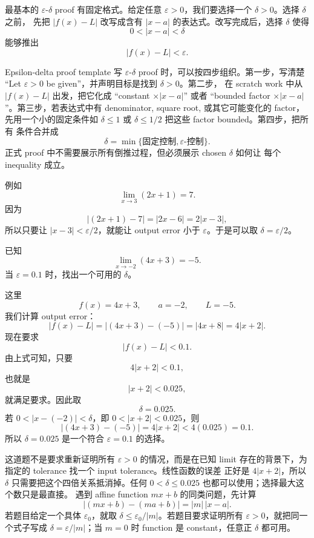 最基本的 \(\varepsilon\)-\(\delta\) proof 有固定格式。给定任意
\(\varepsilon>0\)，我们要选择一个 \(\delta>0\)。选择 \(\delta\) 之前，
先把 \(|f(x)-L|\) 改写成含有 \(|x-a|\) 的表达式。改写完成后，选择
\(\delta\) 使得
\[
  0<|x-a|<\delta
\]
能够推出
\[
  |f(x)-L|<\varepsilon.
\]

\begin{reviewbox}{Epsilon-delta proof template}
写 \(\varepsilon\)-\(\delta\) proof 时，可以按四步组织。第一步，写清楚
``Let \(\varepsilon>0\) be given''，并声明目标是找到 \(\delta>0\)。第二步，
在 scratch work 中从 \(|f(x)-L|\) 出发，把它化成
``constant \(\times |x-a|\)'' 或者
``bounded factor \(\times |x-a|\)''。第三步，若表达式中有 denominator,
square root, 或其它可能变化的 factor，先用一个小的固定条件如
\(\delta\leq1\) 或 \(\delta\leq1/2\) 把这些 factor bounded。第四步，把所有
条件合并成
\[
  \delta=\min\{\text{固定控制},\varepsilon\text{-控制}\}.
\]
正式 proof 中不需要展示所有倒推过程，但必须展示 chosen \(\delta\) 如何让
每个 inequality 成立。
\end{reviewbox}

例如
\[
  \lim_{x\to3}(2x+1)=7.
\]
因为
\[
  |(2x+1)-7|=|2x-6|=2|x-3|,
\]
所以只要让 \(|x-3|<\varepsilon/2\)，就能让 output error 小于
\(\varepsilon\)。于是可以取 \(\delta=\varepsilon/2\)。

\begin{exerciseblock}
已知
\[
  \lim_{x\to -2}(4x+3)=-5.
\]
当 \(\varepsilon=0.1\) 时，找出一个可用的 \(\delta\)。
\end{exerciseblock}

\begin{solution}
这里
\[
  f(x)=4x+3,\qquad a=-2,\qquad L=-5.
\]
我们计算 output error：
\[
  |f(x)-L|
  =
  |(4x+3)-(-5)|
  =
  |4x+8|
  =
  4|x+2|.
\]
现在要求
\[
  |f(x)-L|<0.1.
\]
由上式可知，只要
\[
  4|x+2|<0.1,
\]
也就是
\[
  |x+2|<0.025,
\]
就满足要求。因此取
\[
  \delta=0.025.
\]
若 \(0<|x-(-2)|<\delta\)，即 \(0<|x+2|<0.025\)，则
\[
  |(4x+3)-(-5)|
  =
  4|x+2|
  <
  4(0.025)
  =
  0.1.
\]
所以 \(\delta=0.025\) 是一个符合 \(\varepsilon=0.1\) 的选择。
\end{solution}

\begin{explanation}
这道题不是要求重新证明所有 \(\varepsilon>0\) 的情况，而是在已知 limit
存在的背景下，为指定的 tolerance 找一个 input tolerance。线性函数的误差
正好是 \(4|x+2|\)，所以 \(\delta\) 只需要把这个四倍关系抵消掉。任何
\(0<\delta\leq 0.025\) 也都可以使用；选择最大这个数只是最直接。
遇到 affine function \(mx+b\) 的同类问题，先计算
\[
  |(mx+b)-(ma+b)|=|m|\,|x-a|.
\]
若题目给定一个具体 \(\varepsilon_0\)，就取
\(\delta\leq \varepsilon_0/|m|\)。若题目要求证明所有
\(\varepsilon>0\)，就把同一个式子写成
\(\delta=\varepsilon/|m|\)；当 \(m=0\) 时 function 是 constant，任意正
\(\delta\) 都可用。
\end{explanation}

